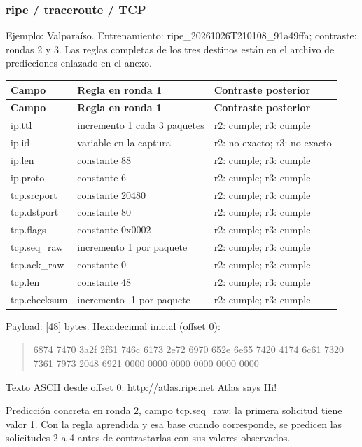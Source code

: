 \subsubsection{ripe / traceroute / TCP}
Ejemplo: Valparaíso. Entrenamiento: ripe\_\allowbreak{}20261026T210108\_\allowbreak{}91a49ffa; contraste: rondas 2 y 3. Las reglas completas de los tres destinos están en el archivo de predicciones enlazado en el anexo.

\begingroup
\fontsize{9}{11}\selectfont
\addtocounter{table}{-1}
\begin{longtable}{p{3.1cm}p{5.8cm}p{5.1cm}}
\toprule
\textbf{Campo} & \textbf{Regla en ronda 1} & \textbf{Contraste posterior} \\ \midrule
\endfirsthead
\toprule
\textbf{Campo} & \textbf{Regla en ronda 1} & \textbf{Contraste posterior} \\ \midrule
\endhead
ip.ttl & incremento 1 cada 3 paquetes & r2: cumple; r3: cumple \\
ip.id & variable en la captura & r2: no exacto; r3: no exacto \\
ip.len & constante 88 & r2: cumple; r3: cumple \\
ip.proto & constante 6 & r2: cumple; r3: cumple \\
tcp.srcport & constante 20480 & r2: cumple; r3: cumple \\
tcp.dstport & constante 80 & r2: cumple; r3: cumple \\
tcp.flags & constante 0x0002 & r2: cumple; r3: cumple \\
tcp.seq\_\allowbreak{}raw & incremento 1 por paquete & r2: cumple; r3: cumple \\
tcp.ack\_\allowbreak{}raw & constante 0 & r2: cumple; r3: cumple \\
tcp.len & constante 48 & r2: cumple; r3: cumple \\
tcp.checksum & incremento -1 por paquete & r2: cumple; r3: cumple \\
\bottomrule
\end{longtable}
\endgroup
Payload: [48] bytes. Hexadecimal inicial (offset 0):

\begin{quote}\ttfamily\footnotesize\raggedright 6874 7470 3a2f 2f61 746c 6173 2e72 6970 652e 6e65 7420 4174 6c61 7320 7361 7973 2048 6921 0000 0000 0000 0000 0000 0000\end{quote}
Texto ASCII desde offset 0: http://atlas.ripe.net Atlas says Hi!

Predicción concreta en ronda 2, campo tcp.seq\_\allowbreak{}raw: la primera solicitud tiene valor 1. Con la regla aprendida y esa base cuando corresponde, se predicen las solicitudes 2 a 4 antes de contrastarlas con sus valores observados.

